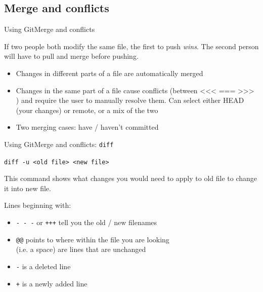 \documentclass[10pt,compress]{beamer} %
\begin{document}
\subsection{Merge and conflicts}
\begin{frame}{Using Git}{Merge and conflicts}

If two people both modify the same file, the first to push \emph{wins}.
The second person will have to pull and merge before pushing.

\begin{itemize}
 \item Changes in different parts of a file are automatically merged
 \item Changes in the same part of a file cause conflicts (between <<<
=== >>> ) and require the user to manually resolve them. Can
select either HEAD (your changes) or remote, or a mix of the two
\item Two merging cases: have / haven't committed
\end{itemize}

\end{frame}

\begin{frame}{Using Git}{Merge and conflicts: \texttt{diff}}

\texttt{diff -u <old file> <new file>} 

This command shows what changes you would need to apply to old file to change it into
new file.

Lines beginning with:
\begin{itemize}
 \item \texttt{- - -} or \texttt{+++} tell you the old / new filenames
 \item \texttt{@@} points to where within the file you are looking \\
       (i.e. a space) are lines that are unchanged
 \item \texttt{-} is a deleted line
 \item \texttt{+} is a newly added line
\end{itemize}

\end{frame}
\end{document}
